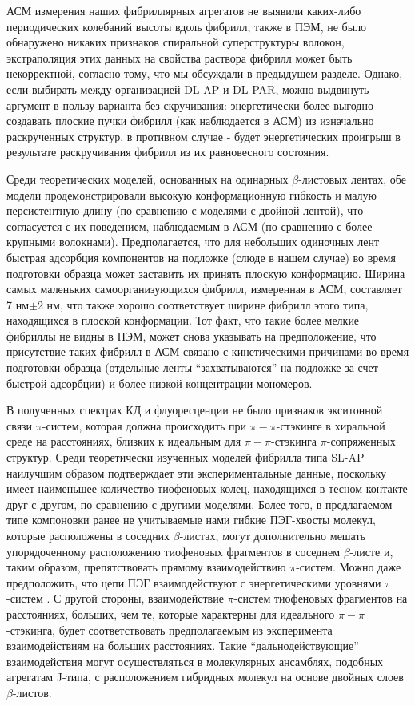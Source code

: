     АСМ измерения наших фибриллярных агрегатов не выявили каких-либо периодических колебаний высоты вдоль фибрилл, также в ПЭМ, не было обнаружено никаких признаков спиральной суперструктуры волокон, экстраполяция этих данных на свойства раствора фибрилл может быть некорректной, согласно тому, что мы обсуждали в предыдущем разделе. Однако, если выбирать между организацией DL-AP и DL-PAR, можно выдвинуть аргумент в пользу варианта без скручивания: энергетически более выгодно создавать плоские пучки фибрилл (как наблюдается в АСМ) из изначально раскрученных структур, в противном случае - будет энергетических проигрыш в результате раскручивания фибрилл из их равновесного состояния.
    
    Среди теоретических моделей, основанных на одинарных $\beta$-листовых лентах, обе модели продемонстрировали высокую конформационную гибкость и малую персистентную длину (по сравнению с моделями с двойной лентой), что согласуется с их поведением, наблюдаемым в АСМ (по сравнению с более крупными волокнами). Предполагается, что для небольших одиночных лент быстрая адсорбция компонентов на подложке (слюде в нашем случае) во время подготовки образца может заставить их принять плоскую конформацию. Ширина самых маленьких самоорганизующихся фибрилл, измеренная в АСМ, составляет 7 нм$\pm$2 нм, что также хорошо соответствует ширине фибрилл этого типа, находящихся в плоской конформации. Тот факт, что такие более мелкие фибриллы не видны в ПЭМ, может снова указывать на предположение, что присутствие таких фибрилл в АСМ связано с кинетическими причинами во время подготовки образца (отдельные ленты ``захватываются'' на подложке за счет быстрой адсорбции) и более низкой концентрации мономеров.
    
    В полученных спектрах КД и флуоресценции не было признаков экситонной связи $\pi$-систем, которая должна происходить при $\pi -\pi$-стэкинге в хиральной среде на расстояниях, близких к идеальным для $\pi -\pi$-стэкинга $\pi$-сопряженных структур. Среди теоретически изученных моделей фибрилла типа SL-AP наилучшим образом подтверждает эти экспериментальные данные, поскольку имеет наименьшее количество тиофеновых колец, находящихся в тесном контакте друг с другом, по сравнению с другими моделями. Более того, в предлагаемом типе компоновки ранее не учитываемые нами гибкие ПЭГ-хвосты молекул, которые расположены в соседних $\beta$-листах, могут дополнительно мешать упорядоченному расположению тиофеновых фрагментов в соседнем $\beta$-листе и, таким образом, препятствовать прямому взаимодействию $\pi$-систем. Можно даже предположить, что цепи ПЭГ взаимодействуют с энергетическими уровнями $\pi$-систем \cite{schillinger_oligothiophene_2009}. С другой стороны, взаимодействие $\pi$-систем тиофеновых фрагментов на расстояниях, больших, чем те, которые характерны для идеального $\pi -\pi$-стэкинга, будет соответствовать предполагаемым из эксперимента взаимодействиям на больших расстояниях. Такие ``дальнодействующие'' взаимодействия могут осуществляться в молекулярных ансамблях, подобных агрегатам J-типа, с расположением гибридных молекул на основе двойных слоев $\beta$-листов.
    
